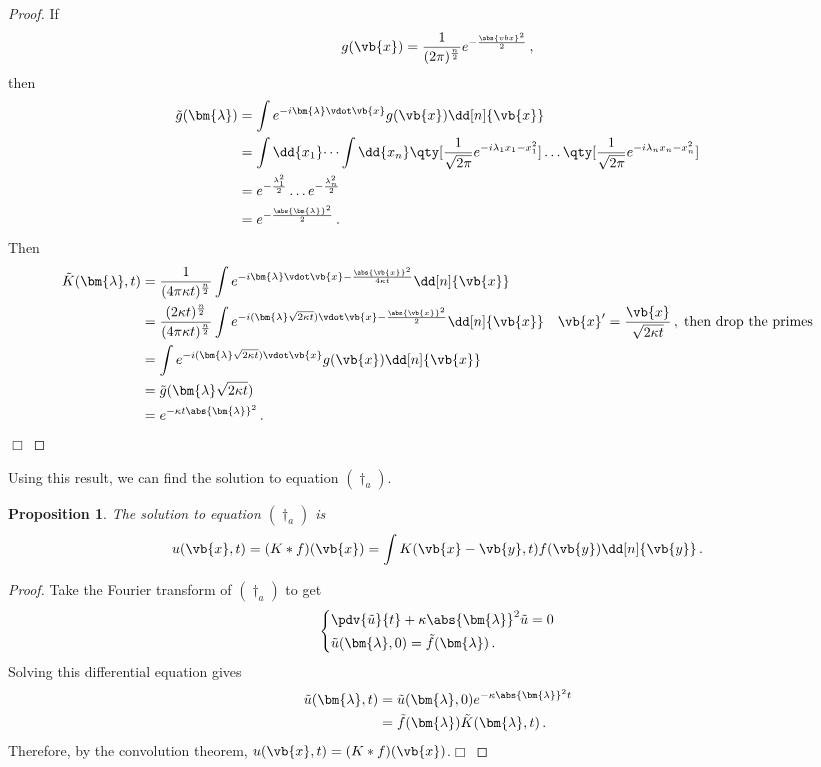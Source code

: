 \documentclass{article}
\theoremstyle{plain}\theoremheaderfont{\normalfont\itshape}\theorembodyfont{\rmfamily}\theoremseparator{.}\newtheorem*{rem}{Remark}\newtheorem*{ex}{Example}\newtheorem*{proof}{Proof}\newtheorem*{altp}{Alternative proof}
\theoremstyle{plain}\theoremheaderfont{\normalfont\bfseries}\theorembodyfont{\rmfamily}\theoremseparator{.}\newtheorem{thm}{Theorem}[section]\newtheorem{lem}[thm]{Lemma}\newtheorem{prop}[thm]{Proposition}\newtheorem*{cor}{Corollary}\newtheorem{defn}[thm]{Definition}\newtheorem{clm}[thm]{Claim}\newtheorem{clminproof}{Claim}
\theoremstyle{break}\theoremheaderfont{\normalfont\itshape}\theorembodyfont{\rmfamily}\theoremseparator{.\medskip}\newtheorem*{proofskip}{Proof}\newtheorem*{exs}{Examples}\newtheorem*{rems}{Remarks}
\theoremstyle{break}\theoremheaderfont{\normalfont\bfseries}\theorembodyfont{\rmfamily}\theoremseparator{.\medskip}\newtheorem{lemskip}[thm]{Lemma}\newtheorem{defnskip}[thm]{Definition}\newtheorem{propskip}[thm]{Proposition}\newtheorem{thmskip}[thm]{Theorem}
\numberwithin{equation}{section}
\newcommand{\qed}{\hfill\ensuremath{\Box}}
\newcommand{\bl}{\bm{\lambda}}
\begin{document}
	\begin{proof}
		If
		\[g(\vb{x})=\frac{1}{(2\pi)^\frac{n}{2}}e^{-\frac{\abs{vb{x}}^2}{2}}\,,\]
		then
		\begin{align*}
			\tilde{g}(\bl)&=\int e^{-i\bl\vdot\vb{x}}g(\vb{x})\dd[n]{\vb{x}}\\
			&=\int\dd{x_1}\dots\int\dd{x_n}\qty[\frac{1}{\sqrt{2\pi}}e^{-i\lambda_1x_1-x_1^2}]\dots\qty[\frac{1}{\sqrt{2\pi}}e^{-i\lambda_nx_n-x_n^2}]\\
			&=e^{-\frac{\lambda_1^2}{2}}\dots e^{-\frac{\lambda_n^2}{2}}\\
			&=e^{-\frac{\abs{\bl}^2}{2}}\,.
		\end{align*}
		Then
		\begin{align*}
			\tilde{K}(\bl,t)&=\frac{1}{(4\pi\kappa t)^\frac{n}{2}}\int e^{-i\bl\vdot\vb{x}-\frac{\abs{\vb{x}}^2}{4\kappa t}}\dd[n]{\vb{x}}\\
			&=\frac{(2\kappa t)^\frac{n}{2}}{(4\pi\kappa t)^\frac{n}{2}}\int e^{-i(\bl\sqrt{2\kappa t})\vdot\vb{x}-\frac{\abs{\vb{x}}^2}{2}}\dd[n]{\vb{x}} & \vb{x}'=\frac{\vb{x}}{\sqrt{2\kappa t}}\,,\;\text{then drop the primes}\\
			&=\int e^{-i(\bl\sqrt{2\kappa t})\vdot\vb{x}}g(\vb{x})\dd[n]{\vb{x}}\\
			&=\tilde{g}(\bl\sqrt{2\kappa t})\\
			&=e^{-\kappa t\abs{\bl}^2}\,.
		\end{align*}\qed
	\end{proof}
	Using this result, we can find the solution to equation \((\dagger_a)\).
	\begin{prop}
		The solution to equation \((\dagger_a)\) is 
		\[u(\vb{x},t)=(K*f)(\vb{x})=\int K(\vb{x}-\vb{y},t)f(\vb{y})\dd[n]{\vb{y}}\,.\]
	\end{prop}
	\begin{proof}
		Take the Fourier transform of \((\dagger_a)\) to get
		\[\left\{\begin{aligned}
			&\pdv{\tilde{u}}{t}+\kappa\abs{\bl}^2\tilde{u}=0\\
			&\tilde{u}(\bl,0)=\tilde{f}(\bl)\,.
		\end{aligned}\right.\]
		Solving this differential equation gives
		\begin{align*}
			\tilde{u}(\bl,t)&=\tilde{u}(\bl,0)e^{-\kappa\abs{\bl}^2t}\\
			&=\tilde{f}(\bl)\tilde{K}(\bl,t)\,.
		\end{align*}
		Therefore, by the convolution theorem, \(u(\vb{x},t)=(K*f)(\vb{x})\).\qed
	\end{proof}
\end{document}
